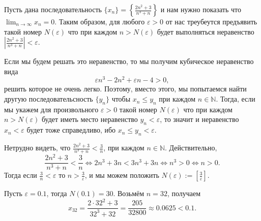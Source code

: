 \begin{example}
    Пусть дана последовательность $\{x_n\} = \left\{ \frac{2n^2 +3}{n^3+n} \right\}$ и нам нужно показать что $\lim_{n\to \infty}x_n = 0$. Таким образом, для любого $\varepsilon>0$ от нас треубеутся предъявить такой номер $N(\varepsilon)$ что при каждом $n>N(\varepsilon)$ будет выполняться неравенство $\left| \frac{2n^2+3}{n^3+n} \right| <\varepsilon.$

    Если мы будем решать это неравенство, то мы получим кубическое неравенство вида 
    \[
      \varepsilon n^3 -2n^2 + \varepsilon n - 4 >0,
    \]
    решить которое не очень легко. Поэтому, вместо этого, мы попытаемся найти другую последовательсность $\{y_n\}$ чтобы $x_n \le y_n$ при каждом $n\in \mathbb{N}$. Тогда, если мы укажем для произвольного $\varepsilon >0$ такой номер $N(\varepsilon)$ что при каждом $n>N(\varepsilon)$ будет иметь место неравенство $y_n <\varepsilon$, то значит и неравенство $x_n < \varepsilon$ будет тоже справедливо, ибо $x_n \le y_n < \varepsilon.$

    Нетрудно видеть, что $\frac{2n^2 + 3}{n^3+n}< \frac{3}{n}$, при каждом $n\in\mathbb{N}$. Действительно,
    \[
   \frac{2n^2 + 3}{n^3+n}< \frac{3}{n} \Longleftrightarrow 2n^3 +3n < 3n^3 + 3n \Longleftrightarrow n^3 >0 \Longleftrightarrow n>0.
    \]
Тогда если $\frac{3}{n}<\varepsilon$ то $n > \frac{3}{\varepsilon}$, и мы можем положить $N(\varepsilon):=\left[ \frac{3}{\varepsilon} \right]$. 

Пусть $\varepsilon = 0.1$, тогда $N(0.1) = 30$. Возьмём $n=32$, получаем
\[
 x_{32} = \frac{2 \cdot 32^2 + 3}{32^3 + 32} = \frac{205}{32800} \approx 0.0625 < 0.1.
\]
\end{example}


